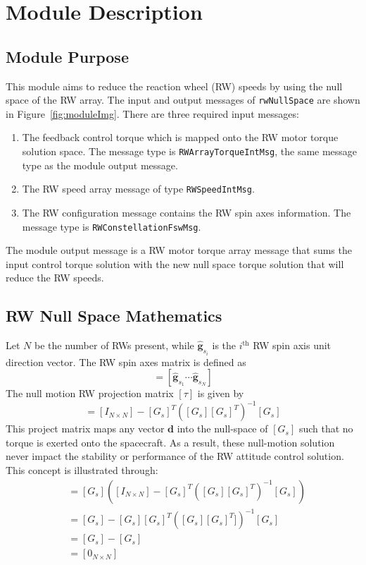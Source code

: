 



\section{Module Description}
\subsection{Module Purpose}
This module aims to reduce the reaction wheel (RW) speeds by using the null space of the RW array.  The input and output messages of {\tt rwNullSpace} are shown in Figure~\ref{fig:moduleImg}.  There are three required input messages:
\begin{enumerate}
	\item The feedback control torque which is mapped onto the RW motor torque solution space.  The message type is {\tt RWArrayTorqueIntMsg}, the same message type as the module output message.
	\item The RW speed array message of type {\tt RWSpeedIntMsg}.
	\item The RW configuration message contains the RW spin axes information. The message type is {\tt RWConstellationFswMsg}.
\end{enumerate}
The module output message is a RW motor torque array message that sums the input control torque solution with the new null space torque solution that will reduce the RW speeds.  


\subsection{RW Null Space Mathematics}
Let $N$ be the number of RWs present, while $\hat{\bm g}_{s_{i}}$ is the $i^{\text{th}}$ RW spin axis unit direction vector.  The RW spin axes matrix is defined as
\begin{equation}
	[G_{s}] = [\hat{\bm g}_{s_{1}} \cdots \hat{\bm g}_{s_{N}}]
\end{equation}
The null motion RW projection matrix $[\tau]$ is given by\cite{schaub}
\begin{equation}
	[\tau] = [I_{N\times N}] - [G_{s}]^{T} \left( [G_{s}] [G_{s}]^{T} \right)^{-1} [G_{s}]
\end{equation}
This project matrix maps any vector $\bm d$ into the null-space of $[G_{s}]$ such that no torque is exerted onto the spacecraft.  As a result, these null-motion solution never impact the stability or performance of the RW attitude control solution.  This concept is illustrated through:
\begin{align*}
	[G_{s}] [\tau] &= [G_{s}] \left( [I_{N\times N}] - [G_{s}]^{T} \left( [G_{s}] [G_{s}]^{T} \right)^{-1} [G_{s}] \right)
	\\
	&= [G_{s}] - [G_{s}] [G_{s}]^{T} \left( [G_{s}] [G_{s}]^{T}] \right)^{-1} [G_{s}] \\
	&= [G_{s}] - [G_{s}] \\
	&= [0_{N\times N}]
\end{align*}


